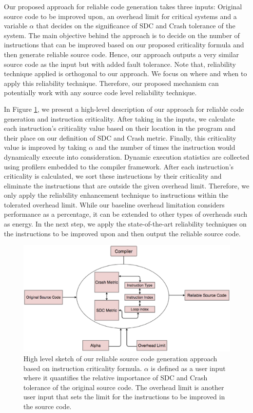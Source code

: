 Our proposed approach for reliable code generation takes three inputs: Original source code to be improved upon, an overhead limit for critical systems and a variable $\alpha$ that decides on the significance of SDC and Crash tolerance of the system. The main objective behind the approach is to decide on the number of instructions that can be improved based on our proposed criticality formula and then generate reliable source code. Hence, our approach outputs a very similar source code as the input but with added fault tolerance. Note that, reliability technique applied is orthogonal to our approach. We focus on where and when to apply this reliability technique. Therefore, our proposed mechanism can potentially work with any source code level reliability technique. 

In Figure \ref{fig:big_picture2}, we present a high-level description of our approach for reliable code generation and instruction criticality. After taking in the inputs, we calculate each instruction's criticality value based on their location in the program and their place on our definition of SDC and Crash metric. Finally, this criticality value is improved by taking $\alpha$ and the number of times the instruction would dynamically execute into consideration. Dynamic execution statistics are collected using profilers embedded to the compiler framework. After each instruction's criticality is calculated, we sort these instructions by their criticality and eliminate the instructions that are outside the given overhead limit. Therefore, we only apply the reliability enhancement technique to instructions within the tolerated overhead limit. While our baseline overhead limitation considers performance as a percentage, it can be extended to other types of overheads such as energy. In the next step, we apply the state-of-the-art reliability techniques on the instructions to be improved upon and then output the reliable source code. 

\begin{figure}[!t]
\begin{center}
\includegraphics[scale=0.3]{./figures/eps_bb.eps}
\end{center}
\caption
{
High level sketch of our reliable source code generation approach based on instruction criticality formula. $\alpha$ is defined as a user input where it quantifies the relative importance of SDC and Crash tolerance of the original source code. The overhead limit is another user input that sets the limit for the instructions to be improved in the source code. 
}
\label{fig:big_picture2}
\end{figure}

